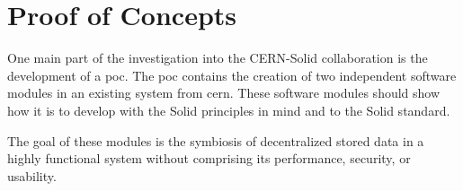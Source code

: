\section{Proof of Concepts}

One main part of the investigation into the CERN-Solid collaboration is the development of a \gls{poc}. The \gls{poc} contains the creation of two independent software modules in an existing system from \gls{cern}. These software modules should show how it is to develop with the Solid principles in mind and to the Solid standard.

The goal of these modules is the symbiosis of decentralized stored data in a highly functional system without comprising its performance, security, or usability.


\newpage

\newpage

